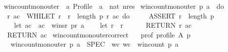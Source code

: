 \begin{isabellebody}
\isanewline
{}\isamarkupfalse%
\ win{\isacharunderscore}{\kern0pt}count{\isacharunderscore}{\kern0pt}mon{\isacharunderscore}{\kern0pt}outer\ {\isacharcolon}{\kern0pt}{\isacharcolon}{\kern0pt}\ {\isachardoublequoteopen}{\isacharprime}{\kern0pt}a\ Profile\ {\isasymRightarrow}\ {\isacharprime}{\kern0pt}a\ {\isasymRightarrow}\ nat\ nres{\isachardoublequoteclose}\ \isanewline
{\isachardoublequoteopen}win{\isacharunderscore}{\kern0pt}count{\isacharunderscore}{\kern0pt}mon{\isacharunderscore}{\kern0pt}outer\ p\ a\ {\isasymequiv}\ do\ {\isacharbraceleft}{\kern0pt}\isanewline
\ \ {\isacharparenleft}{\kern0pt}r{\isacharcomma}{\kern0pt}\ ac{\isacharparenright}{\kern0pt}\ {\isasymleftarrow}\ WHILET\ {\isacharparenleft}{\kern0pt}{\isasymlambda}{\isacharparenleft}{\kern0pt}r{\isacharcomma}{\kern0pt}\ {\isacharunderscore}{\kern0pt}{\isacharparenright}{\kern0pt}{\isachardot}{\kern0pt}\ r\ {\isacharless}{\kern0pt}\ length\ p{\isacharparenright}{\kern0pt}\ {\isacharparenleft}{\kern0pt}{\isasymlambda}{\isacharparenleft}{\kern0pt}r{\isacharcomma}{\kern0pt}\ ac{\isacharparenright}{\kern0pt}{\isachardot}{\kern0pt}\ do\ {\isacharbraceleft}{\kern0pt}\isanewline
\ \ \ \ ASSERT\ {\isacharparenleft}{\kern0pt}r\ {\isacharless}{\kern0pt}\ length\ p{\isacharparenright}{\kern0pt}{\isacharsemicolon}{\kern0pt}\isanewline
\ \ \ \ let\ ac\ {\isacharequal}{\kern0pt}\ ac\ {\isacharplus}{\kern0pt}\ winsr\ {\isacharparenleft}{\kern0pt}p{\isacharbang}{\kern0pt}r{\isacharparenright}{\kern0pt}\ a{\isacharsemicolon}{\kern0pt}\isanewline
\ \ \ \ let\ r\ {\isacharequal}{\kern0pt}\ r\ {\isacharplus}{\kern0pt}\ {}{\isacharsemicolon}{\kern0pt}\isanewline
\ \ \ \ RETURN\ {\isacharparenleft}{\kern0pt}r{\isacharcomma}{\kern0pt}\ ac{\isacharparenright}{\kern0pt}\isanewline
\ \ {\isacharbraceright}{\kern0pt}{\isacharparenright}{\kern0pt}{\isacharparenleft}{\kern0pt}{}{\isacharcomma}{\kern0pt}{}{\isacharparenright}{\kern0pt}{\isacharsemicolon}{\kern0pt}\isanewline
\ \ RETURN\ ac\isanewline
{\isacharbraceright}{\kern0pt}{\isachardoublequoteclose}\isanewline
\isanewline
{}\isamarkupfalse%
\ win{\isacharunderscore}{\kern0pt}count{\isacharunderscore}{\kern0pt}mon{\isacharunderscore}{\kern0pt}outer{\isacharunderscore}{\kern0pt}correct{\isacharcolon}{\kern0pt}\isanewline
\ \ \ prof{\isacharcolon}{\kern0pt}\ {\isachardoublequoteopen}profile\ A\ p{\isachardoublequoteclose}\isanewline
\ \ \ {\isachardoublequoteopen}win{\isacharunderscore}{\kern0pt}count{\isacharunderscore}{\kern0pt}mon{\isacharunderscore}{\kern0pt}outer\ p\ a\ {\isasymle}\ SPEC\ {\isacharparenleft}{\kern0pt}{\isasymlambda}\ wc{\isachardot}{\kern0pt}\ wc\ {\isacharequal}{\kern0pt}\ win{\isacharunderscore}{\kern0pt}count\ p\ a{\isacharparenright}{\kern0pt}{\isachardoublequoteclose}\isanewline

\end{isabellebody}
